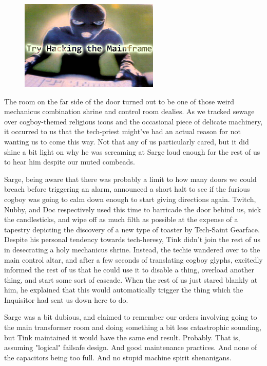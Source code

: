 \begin{figure}
	\begin{center}
		\includegraphics[width=\figwidth]{pics/18/9.png}
	\end{center}
\end{figure}
The room on the far side of the door turned out to be one of those weird mechanicus combination shrine and control room dealies. 
As we tracked sewage over cogboy-themed religious icons and the occasional piece of delicate machinery, it occurred to us that the tech-priest might've had an actual reason for not wanting us to come this way. 
Not that any of us particularly cared, but it did shine a bit light on why he was screaming at Sarge loud enough for the rest of us to hear him despite our muted combeads.

Sarge, being aware that there was probably a limit to how many doors we could breach before triggering an alarm, announced a short halt to see if the furious cogboy was going to calm down enough to start giving directions again. 
Twitch, Nubby, and Doc respectively used this time to barricade the door behind us, nick the candlesticks, and wipe off as much filth as possible at the expense of a tapestry depicting the discovery of a new type of toaster by Tech-Saint Gearface. 
Despite his personal tendency towards tech-heresy, Tink didn't join the rest of us in desecrating a holy mechanicus shrine. 
Instead, the techie wandered over to the main control altar, and after a few seconds of translating cogboy glyphs, excitedly informed the rest of us that he could use it to disable a thing, overload another thing, and start some sort of cascade. 
When the rest of us just stared blankly at him, he explained that this would automatically trigger the thing which the Inquisitor had sent us down here to do. 


Sarge was a bit dubious, and claimed to remember our orders involving going to the main transformer room and doing something a bit less catastrophic sounding, but Tink maintained it would have the same end result. 
Probably. 
That is, assuming "logical" failsafe design. 
And good maintenance practices. 
And none of the capacitors being too full. 
And no stupid machine spirit shenanigans.

